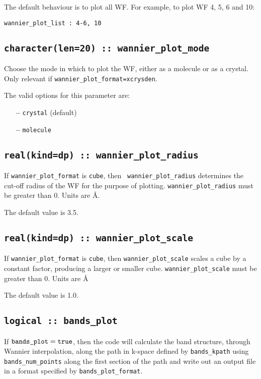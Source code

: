  The default behaviour is to plot all WF. For example,
 to plot WF 4, 5, 6 and 10:

 \verb#wannier_plot_list : 4-6, 10#


\subsection[wannier\_plot\_mode]{\tt character(len=20) :: wannier\_plot\_mode}

Choose the mode in which to plot the WF, either as a molecule
or as a crystal. Only relevant if {\tt wannier\_plot\_format=xcrysden}. 

The valid options for this parameter are:
\begin{itemize}
\item[{\bf --}] \verb#crystal# (default)
\item[{\bf --}] \verb#molecule# 
\end{itemize}


\subsection[wannier\_plot\_radius]{\tt real(kind=dp) ::
  wannier\_plot\_radius}

If {\tt wannier\_plot\_format} is {\tt cube}, then {\tt
  wannier\_plot\_radius} determines the cut-off radius of the WF for
  the purpose of plotting. {\tt wannier\_plot\_radius} must be greater than
  0. Units are \AA.

The default value is 3.5. 

\subsection[wannier\_plot\_scale]{\tt real(kind=dp) ::
  wannier\_plot\_scale}
If {\tt wannier\_plot\_format} is {\tt cube}, then {\tt wannier\_plot\_scale} 
scales a cube by a constant factor, producing a larger or smaller cube. {\tt wannier\_plot\_scale} must 
be greater than 0. Units are \AA

The default value is 1.0.

\subsection[bands\_plot]{\tt logical :: bands\_plot}

If $\verb#bands_plot#=\verb#true#$, then the code will calculate the band
structure, through Wannier interpolation,
 along
the path in k-space defined by \verb#bands_kpath# using \verb#bands_num_points# along the first
section of the path and write out an output file in a format specified
by \verb#bands_plot_format#. 

